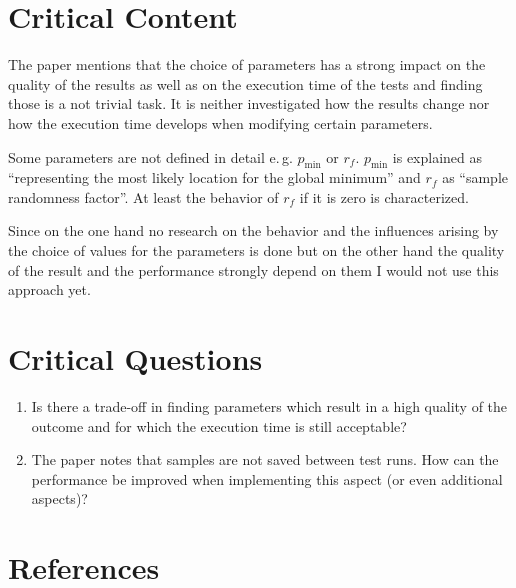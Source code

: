 \documentclass[oneside, notitlepage, twocolumn]{scrartcl}
\newcommand{\eg}{e.\,g.\xspace}
\begin{document}
\section{Critical Content}
The paper mentions that the choice of parameters has a strong impact on the quality of the results as well as on the execution time of the tests and finding those is a not trivial task.
It is neither investigated how the results change nor how the execution time develops when modifying certain parameters.\par
Some parameters are not defined in detail \eg{} \(p_\min\) or \(r_f\).
\(p_\min\) is explained as ``representing the most likely location for the global minimum'' and \(r_f\) as ``sample randomness factor''.
At least the behavior of \(r_f\) if it is zero is characterized.\par
Since on the one hand no research on the behavior and the influences arising by the choice of values for the parameters is done but on the other hand the quality of the result and the performance strongly depend on them I would not use this approach yet.

\section{Critical Questions}
\begin{enumerate}
    \item Is there a trade-off in finding parameters which result in a high quality of the outcome and for which the execution time is still acceptable?
    \item The paper notes that samples are not saved between test runs.
        How can the performance be improved when implementing this aspect (or even additional aspects)?
\end{enumerate}

\printglossary[type=\acronymtype, title=List of Abbreviations]

\section{References}
\begingroup
\renewcommand{\section}[2]{}%
\nocite{*}
\printbibliography%
\endgroup
\end{document}
